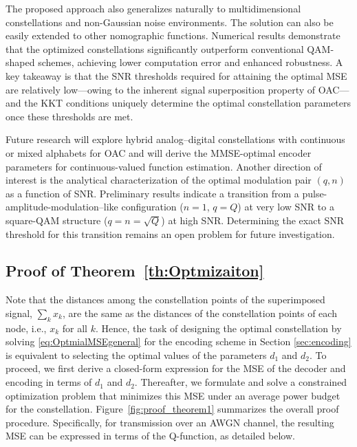 \documentclass[journal,12pt,onecolumn,draftclsnofoot]{IEEEtran}
\theoremstyle{definition}
\begin{document}
The proposed approach also generalizes naturally to multidimensional constellations and non-Gaussian noise environments. The solution can also be easily extended to other nomographic functions.  Numerical results demonstrate that the optimized constellations significantly outperform conventional QAM-shaped schemes, achieving lower computation error and enhanced robustness. A key takeaway is that the SNR thresholds required for attaining the optimal MSE are relatively low—owing to the inherent signal superposition property of OAC—and the KKT conditions uniquely determine the optimal constellation parameters once these thresholds are met.


Future research will explore hybrid analog–digital constellations with continuous or mixed alphabets for OAC and will derive the MMSE-optimal encoder parameters for continuous-valued function estimation.  Another direction of interest is the analytical characterization of the optimal modulation pair $(q, n)$ as a function of SNR. 
Preliminary results indicate a transition from a pulse-amplitude-modulation–like configuration ($n=1$, $q=Q$) at very low SNR to a square-QAM structure ($q=n=\sqrt{Q}$) at high SNR.  Determining the exact SNR threshold for this transition remains an open problem for future investigation.


\appendix





\subsection{Proof of Theorem~\ref{th:Optmizaiton}}\label{sec:Optimal}



Note that the distances among the constellation points of the superimposed signal, $\sum_{k}x_k$, are the same as the distances of the constellation points of each node, i.e., $x_k$ for all $k$. Hence,  the task of designing the optimal constellation by solving \eqref{eq:OptmialMSEgeneral} for the encoding scheme in Section \ref{sec:encoding} is equivalent to selecting the optimal values of the parameters $d_1$ and  $d_2$.  To proceed, we first derive a closed-form expression for the MSE of the decoder and encoding in terms of $d_1$ and  $d_2$. Thereafter, we formulate and solve a constrained optimization problem that minimizes this MSE under an average power budget for the constellation. Figure~\ref{fig:proof_theorem1} summarizes the overall proof procedure.    Specifically, for transmission over an AWGN channel, the resulting MSE can be expressed in terms of the Q-function, as detailed below.
\end{document}
